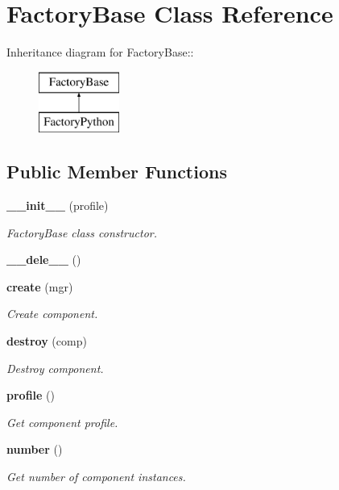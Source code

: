 \section{Factory\-Base Class Reference}
\label{classFactoryBase}
Inheritance diagram for Factory\-Base::\begin{figure}[H]
\begin{center}
\leavevmode
\includegraphics[height=2cm]{classFactoryBase}
\end{center}
\end{figure}
\subsection*{Public Member Functions}
\begin{CompactItemize}
\item 
{\bf \_\-\_\-init\_\-\_\-} (profile)
\begin{CompactList}\small\item\em Factory\-Base class constructor. \item\end{CompactList}\item 
{\bf \_\-\_\-dele\_\-\_\-} ()
\item 
{\bf create} (mgr)
\begin{CompactList}\small\item\em Create component. \item\end{CompactList}\item 
{\bf destroy} (comp)
\begin{CompactList}\small\item\em Destroy component. \item\end{CompactList}\item 
{\bf profile} ()
\begin{CompactList}\small\item\em Get component profile. \item\end{CompactList}\item 
{\bf number} ()
\begin{CompactList}\small\item\em Get number of component instances. \item\end{CompactList}\end{CompactItemize}


